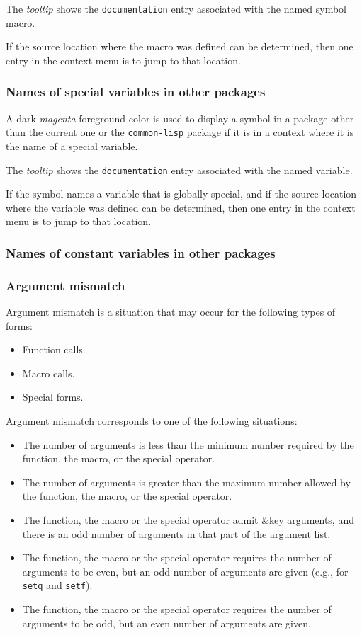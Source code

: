 The \emph{tooltip} shows the \texttt{documentation} entry associated
with the named symbol macro.

If the source location where the macro was defined can be determined,
then one entry in the context menu is to jump to that location.

\subsubsection{Names of special variables in other packages}

A dark \emph{magenta} foreground color is used to display a symbol in
a package other than the current one or the \texttt{common-lisp}
package if it is in a context where it is the name of a special
variable.

The \emph{tooltip} shows the \texttt{documentation} entry associated
with the named variable.

If the symbol names a variable that is globally special, and if
the source location where the variable was defined can be
determined, then one entry in the context menu is to jump to that
location.

\subsubsection{Names of constant variables in other packages}

\subsubsection{Argument mismatch}

Argument mismatch is a situation that may occur for the following
types of forms:

\begin{itemize}
\item Function calls.
\item Macro calls.
\item Special forms.
\end{itemize}

Argument mismatch corresponds to one of the following situations:

\begin{itemize}
\item The number of arguments is less than the minimum number required
  by the function, the macro, or the special operator.
\item The number of arguments is greater than the maximum number
  allowed by the function, the macro, or the special operator.
\item The function, the macro or the special operator admit \&key
  arguments, and there is an odd number of arguments in that part of
  the argument list.
\item The function, the macro or the special operator requires the
  number of arguments to be even, but an odd number of arguments are
  given (e.g., for \texttt{setq} and \texttt{setf}).
\item The function, the macro or the special operator requires the
  number of arguments to be odd, but an even number of arguments are
  given.
\end{itemize}


